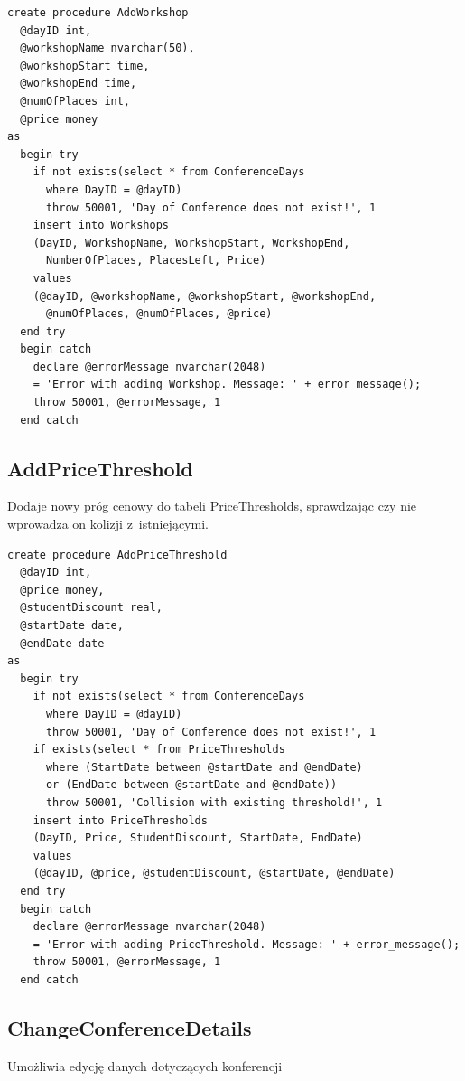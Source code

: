 \documentclass[12pt, a4paper]{mwrep}
\begin{document}
\begin{lstlisting}
create procedure AddWorkshop
  @dayID int,
  @workshopName nvarchar(50),
  @workshopStart time,
  @workshopEnd time,
  @numOfPlaces int,
  @price money
as
  begin try
    if not exists(select * from ConferenceDays 
      where DayID = @dayID)
      throw 50001, 'Day of Conference does not exist!', 1
    insert into Workshops
    (DayID, WorkshopName, WorkshopStart, WorkshopEnd, 
      NumberOfPlaces, PlacesLeft, Price)
    values
    (@dayID, @workshopName, @workshopStart, @workshopEnd, 
      @numOfPlaces, @numOfPlaces, @price)
  end try
  begin catch
    declare @errorMessage nvarchar(2048)
    = 'Error with adding Workshop. Message: ' + error_message();
    throw 50001, @errorMessage, 1
  end catch
\end{lstlisting}

\subsection{AddPriceThreshold}

\noindent Dodaje nowy próg cenowy do tabeli PriceThresholds, sprawdzając czy nie wprowadza on kolizji z~istniejącymi.

\begin{lstlisting}
create procedure AddPriceThreshold
  @dayID int,
  @price money,
  @studentDiscount real,
  @startDate date,
  @endDate date
as
  begin try
    if not exists(select * from ConferenceDays 
      where DayID = @dayID)
      throw 50001, 'Day of Conference does not exist!', 1
    if exists(select * from PriceThresholds 
      where (StartDate between @startDate and @endDate) 
      or (EndDate between @startDate and @endDate))
      throw 50001, 'Collision with existing threshold!', 1
    insert into PriceThresholds
    (DayID, Price, StudentDiscount, StartDate, EndDate)
    values
    (@dayID, @price, @studentDiscount, @startDate, @endDate)
  end try
  begin catch
    declare @errorMessage nvarchar(2048)
    = 'Error with adding PriceThreshold. Message: ' + error_message();
    throw 50001, @errorMessage, 1
  end catch
\end{lstlisting}

\subsection{ChangeConferenceDetails}

\noindent Umożliwia edycję danych dotyczących konferencji
\end{document}
